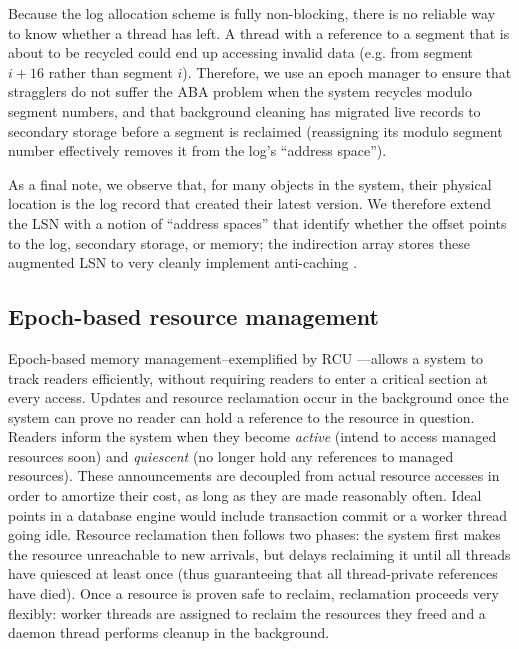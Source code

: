 Because the log allocation scheme is fully non-blocking, there is no reliable way to know whether a thread has left. A thread with a reference to a segment that is about to be recycled could end up accessing invalid data (e.g. from segment $i+16$ rather than segment $i$). Therefore, we use an epoch manager to ensure that stragglers do not suffer the ABA problem when the system recycles modulo segment numbers, and that background cleaning has migrated live records to secondary storage before a segment is reclaimed (reassigning its modulo segment number effectively removes it from the log's ``address space'').

As a final note, we observe that, for many objects in the system, their physical location is the log record that created their latest version. We therefore extend the LSN with a notion of ``address spaces'' that identify whether the offset points to the log, secondary storage, or memory; the indirection array stores these augmented LSN to very cleanly implement anti-caching \cite{DeBrabantPTSZ13}. 

\subsection{Epoch-based resource management}

Epoch-based memory management--exemplified by RCU \cite{McKenneyS98}---allows a system to track readers efficiently, without requiring readers to enter a critical section at every access. Updates and resource reclamation occur in the background once the system can prove no reader can hold a reference to the resource in question. Readers inform the system when they become {\em active} (intend to access managed resources soon) and {\em quiescent} (no longer hold any references to managed resources). These announcements are decoupled from actual resource accesses in order to amortize their cost, as long as they are made reasonably often. Ideal points in a database engine would include transaction commit or a worker thread going idle. Resource reclamation then follows two phases: the system first makes the resource unreachable to new arrivals, but delays reclaiming it until all threads have quiesced at least once (thus guaranteeing that all thread-private references have died). Once a resource is proven safe to reclaim, reclamation proceeds very flexibly: worker threads are assigned to reclaim the resources they freed and a daemon thread performs cleanup in the background.

